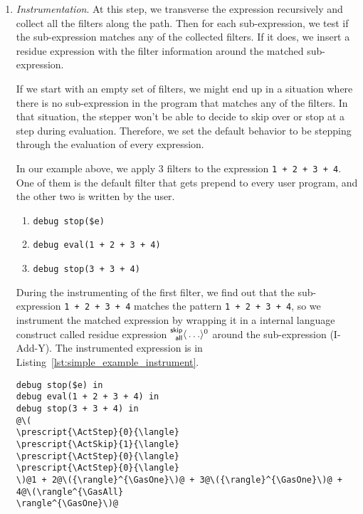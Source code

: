 \begin{enumerate}
\item \emph{Instrumentation}. \label{num:simple_example_instrument} At
  this step, we transverse the expression recursively and collect all
  the filters along the path. Then for each sub-expression, we test if
  the sub-expression matches any of the collected filters. If it does,
  we insert a residue expression with the filter information around
  the matched sub-expression.

  If we start with an empty set of filters, we might end up in a
  situation where there is no sub-expression in the program that
  matches any of the filters. In that situation, the stepper won't be
  able to decide to skip over or stop at a step during evaluation.
  Therefore, we set the default behavior to be stepping through the
  evaluation of every expression.

  In our example above, we apply 3 filters to the expression
  \lstinline[language=hazel]{1 + 2 + 3 + 4}. One of them is the
  default filter that gets prepend to every user program, and the
  other two is written by the user.

  \begin{enumerate}
  \item \lstinline[language=hazel]{debug stop($e)}
  \item \lstinline[language=hazel]{debug eval(1 + 2 + 3 + 4)}
  \item \lstinline[language=hazel]{debug stop(3 + 3 + 4)}
  \end{enumerate}

  During the instrumenting of the first filter, we find out that the
  sub-expression \lstinline[language=hazel]{1 + 2 + 3 + 4} matches the
  pattern \lstinline[language=hazel]{1 + 2 + 3 + 4}, so we instrument
  the matched expression by wrapping it in a internal language
  construct called residue expression
  \(\prescript{\mathsf{skip}}{\mathsf{all}}{\langle} \ldots \rangle^{0}\) around the sub-expression
  (I-Add-Y). The instrumented expression is in Listing~\ref{lst:simple_example_instrument}.

  \begin{lstlisting}[language=hazel,caption={Program after instrumentation},label={lst:simple_example_instrument}]
debug stop($e) in
debug eval(1 + 2 + 3 + 4) in
debug stop(3 + 3 + 4) in
@\(
\prescript{\ActStep}{0}{\langle}
\prescript{\ActSkip}{1}{\langle}
\prescript{\ActStep}{0}{\langle}
\prescript{\ActStep}{0}{\langle}
\)@1 + 2@\({\rangle}^{\GasOne}\)@ + 3@\({\rangle}^{\GasOne}\)@ + 4@\(\rangle^{\GasAll}
\rangle^{\GasOne}\)@\end{lstlisting}


\end{enumerate}
